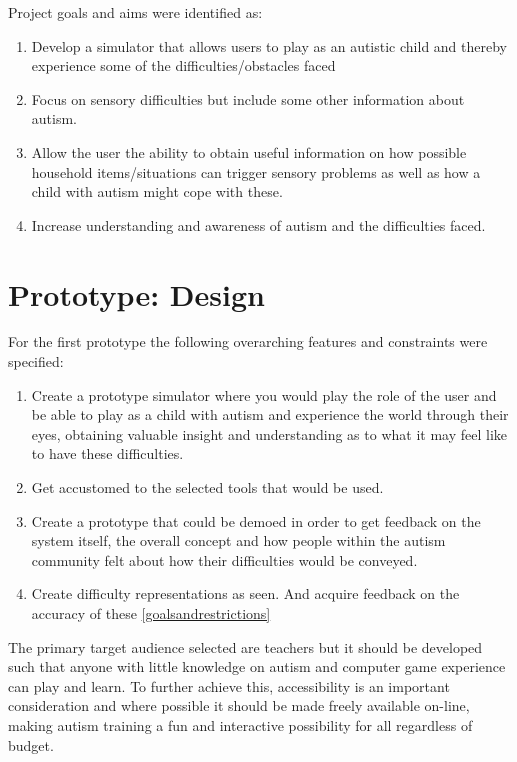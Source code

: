 \documentclass[11pt]{report}
\begin{document}
Project goals and aims were identified as:

\begin{enumerate}
\item Develop a simulator that allows users to play as an autistic child and thereby experience some of the difficulties/obstacles faced
\item Focus on sensory difficulties but include some other information about autism.
\item Allow the user the ability to obtain useful information on how possible household items/situations can trigger sensory problems as well as how a child with autism might cope with these.
\item Increase understanding and awareness of autism and the difficulties faced.
\end{enumerate}

\chapter{Prototype: Design}
\label{sec:prototypedesign}

For the first prototype the following overarching features and constraints were specified:

\begin{enumerate}
\item Create a prototype simulator where you would play the role of the user and be able to play as a child with autism and experience the world through their eyes, obtaining valuable insight and understanding as to what it may feel like to have these difficulties.
\item Get accustomed to the selected tools that would be used.
\item Create a prototype that could be demoed in order to get feedback on the system itself, the overall concept and how people within the autism community felt about how their difficulties would be conveyed. 
\item Create difficulty representations as seen. And acquire feedback on the accuracy of these \ref{goalsandrestrictions}
\end{enumerate}

The primary target audience selected are teachers but it should be developed such that anyone with little knowledge on autism and computer game experience can play and learn. To further achieve this, accessibility is an important consideration and where possible it should be made freely available on-line, making autism training a fun and interactive possibility for all regardless of budget.  
\end{document}
